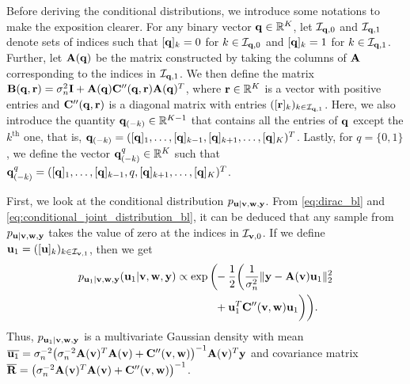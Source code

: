 \documentclass[journal]{IEEEtran}
\begin{document}
Before deriving the conditional distributions, we introduce some notations to make the exposition clearer. For any binary vector ${\bf{q}} \in \mathbb{R}^K$, let $\mathcal{I}_{{\bf{q}}, 0}$ and $\mathcal{I}_{{\bf{q}}, 1}$ denote sets of indices such that $[{\bf{q}}]_k = 0$ for $k \in \mathcal{I}_{{\bf{q}}, 0}$ and $[{\bf{q}}]_k = 1$ for $k \in \mathcal{I}_{{\bf{q}}, 1}$. Further, let ${\bf{A}}({\bf{q}})$ be the matrix constructed by taking the columns of ${\bf{A}}$ corresponding to the indices in $\mathcal{I}_{{\bf{q}}, 1}$. We then define the matrix ${\bf{B}}({\bf{q}}, {\bf{r}}) = \sigma_n^{2} {\bf{I}} + {\bf{A}}({\bf{q}}) {\bf{C}}''({\bf{q}}, {\bf{r}}) {\bf{A}}({\bf{q}})^{T}$, where ${\bf{r}} \in \mathbb{R}^K$ is a vector with positive entries and ${\bf{C}}''({\bf{q}}, {\bf{r}})$ is a diagonal matrix with entries $([{\bf{r}}]_k)_{k \in \mathcal{I}_{{\bf{q}}, 1}}$. Here, we also introduce the quantity ${\bf{q}}_{(-k)} \in \mathbb{R}^{K-1}$ that contains all the entries of ${\bf{q}}$ except the $k^{\text{th}}$ one, that is, ${\bf{q}}_{(-k)} = ([{\bf{q}}]_{1}, \ldots, [{\bf{q}}]_{k-1}, [{\bf{q}}]_{k+1}, \ldots, [{\bf{q}}]_{K})^T$. Lastly, for $q = \{0,1\}$, we define the vector ${\bf{q}}_{(-k)}^{q} \in \mathbb{R}^{K}$ such that ${\bf{q}}_{(-k)}^{q} = ([{\bf{q}}]_{1}, \ldots, [{\bf{q}}]_{k-1}, q, [{\bf{q}}]_{k+1}, \ldots, [{\bf{q}}]_{K})^T$. 

First, we look at the conditional distribution $p_{{\bf{u}} | {\bf{v}}, {\bf{w}}, {\bf{y}}}$. From \eqref{eq:dirac_bl} and \eqref{eq:conditional_joint_distribution_bl}, it can be deduced that any sample from $p_{{\bf{u}} | {\bf{v}}, {\bf{w}}, {\bf{y}}}$ takes the value of zero at the indices in $\mathcal{I}_{{\bf{v}}, 0}$. If we define ${\bf{u}}_1 = ([{\bf{u}}]_k)_{k \in \mathcal{I}_{{\bf{v}}, 1}}$, then we get
\begin{align}\label{eq:conditional_u_bl}
    p_{\M u_1 | \M v, \M w, \M y}(\M u_1 | \M v, \M w, \M y) \propto  \exp\bigg(\hspace{-0.1cm}&-\frac{1}{2}\bigg(\frac{1}{\sigma_n^2}\|\M y - \M A(\M v) \M u_1\|_{2}^{2} \nonumber \\
    & + \M u_1^{T} \M C''(\M v, \M w) \M u_1 \bigg) \bigg).
\end{align}
Thus, $p_{{\bf{u}}_1 | {\bf{v}}, {\bf{w}}, {\bf{y}}}$ is a multivariate Gaussian density with mean $\overline{{\bf{u}}_1} = \sigma_n^{-2} \big(\sigma_n^{-2} {\bf{A}}({\bf{v}})^{T} {\bf{A}}({\bf{v}}) + {\bf{C}}''({\bf{v}}, {\bf{w}})\big)^{-1}{\bf{A}}({\bf{v}})^{T}{\bf{y}}$ and covariance matrix $\overline{{\bf{R}}} = \big(\sigma_n^{-2} {\bf{A}}({\bf{v}})^{T} {\bf{A}}({\bf{v}}) + {\bf{C}}''({\bf{v}}, {\bf{w}})\big)^{-1}$.
\end{document}
